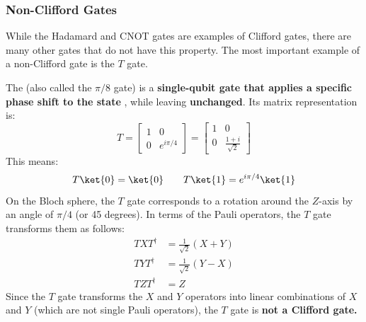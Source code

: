\subsubsection{Non-Clifford Gates}\label{sec:non-clifford-gates}

While the Hadamard and CNOT gates are examples of Clifford gates, there are many other gates that do not have this property. The most important example of a non-Clifford gate is the $T$ gate.

\highspace
The  (also called the $\pi/8$ gate) is a \textbf{single-qubit gate that applies a specific phase shift to the state} , while leaving  \textbf{unchanged}. Its matrix representation is:
\begin{equation}
    T =
    \begin{bmatrix}
        1 & 0 \\
        0 & e^{i\pi/4}
    \end{bmatrix}
    =
    \begin{bmatrix}
        1 & 0 \\[.3em]
        0 & \frac{1 + i}{\sqrt{2}}
    \end{bmatrix}
\end{equation}
This means:
\begin{equation}
    T \ket{0} = \ket{0}
    \qquad
    T \ket{1} = e^{i\pi/4} \ket{1}
\end{equation}
On the Bloch sphere, the $T$ gate corresponds to a rotation around the $Z$-axis by an angle of $\pi/4$ (or 45 degrees). In terms of the Pauli operators, the $T$ gate transforms them as follows:
\begin{equation}
    \begin{aligned}
        T X T^\dagger &=
        \frac{1}{\sqrt{2}} (X + Y) \\
        T Y T^\dagger &=
        \frac{1}{\sqrt{2}} (Y - X) \\
        T Z T^\dagger &=
        Z
    \end{aligned}
\end{equation}
Since the $T$ gate transforms the $X$ and $Y$ operators into linear combinations of $X$ and $Y$ (which are not single Pauli operators), the $T$ gate is \textbf{not a Clifford gate.}

